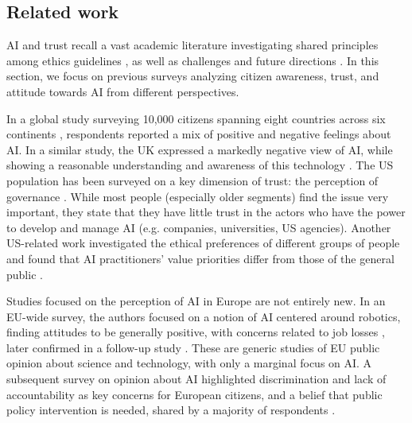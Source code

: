 \documentclass{article}
\begin{document}
\subsection{Related work}

AI and trust recall a vast academic literature investigating shared principles among ethics guidelines \cite{hagendorff2020ethics,gille2020we,hongladarom23}, as well as challenges and future directions \cite{siau2018building,lockey2021review,jacovi2021formalizing,glikson2020human,lee2018understanding}. In this section, we focus on previous surveys analyzing citizen awareness, trust, and attitude towards AI from different perspectives. 

In a global study surveying 10,000 citizens spanning eight countries across six continents \cite{kelley2021exciting}, respondents reported a mix of positive and negative feelings about AI. In a similar study, the UK expressed a markedly negative view of AI, while showing a reasonable understanding and awareness of this technology \cite{cave2019scary}. The US population has been surveyed on a key dimension of trust: the perception of governance \cite{zhang2019artificial,zhang2020us}. While most people (especially older segments) find the issue very important, they state that they have little trust in the actors who have the power to develop and manage AI (e.g. companies, universities, US agencies). Another US-related work investigated the ethical preferences of different groups of people and found that AI practitioners' value priorities differ from those of the general public \cite{jakesch2022different}. 

Studies focused on the perception of AI in Europe are not entirely new. In an EU-wide survey, the authors focused on a notion of AI centered around robotics, finding attitudes to be generally positive, with concerns related to job losses \cite{european2017special}, later confirmed in a follow-up study \cite{european2021special}. These are generic studies of EU public opinion about science and technology, with only a marginal focus on AI. %
A subsequent survey on opinion about AI highlighted discrimination and lack of accountability as key concerns for European citizens, and a belief that public policy intervention is needed, shared by a majority of respondents \cite{european2019}.
\end{document}
